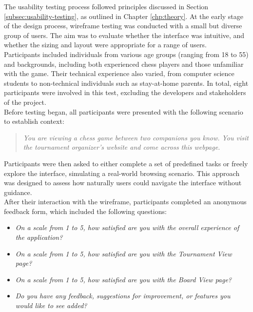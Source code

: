 The usability testing process followed principles discussed in Section \ref{subsec:usability-testing}, as outlined in Chapter \ref{chp:theory}. At the early stage of the design process, wireframe testing was conducted with a small but diverse group of users. The aim was to evaluate whether the interface was intuitive, and whether the sizing and layout were appropriate for a range of users. \\

Participants included individuals from various age groups (ranging from 18 to 55) and backgrounds, including both experienced chess players and those unfamiliar with the game. Their technical experience also varied, from computer science students to non-technical individuals such as stay-at-home parents. In total, eight participants were involved in this test, excluding the developers and stakeholders of the project. \\

Before testing began, all participants were presented with the following scenario to establish context:

\begin{quote}
\textit{You are viewing a chess game between two companions you know. You visit the tournament organizer's website and come across this webpage.}
\end{quote}

Participants were then asked to either complete a set of predefined tasks or freely explore the interface, simulating a real-world browsing scenario. This approach was designed to assess how naturally users could navigate the interface without guidance. \\

After their interaction with the wireframe, participants completed an anonymous feedback form, which included the following questions:

\begin{itemize}
    \item \textit{On a scale from 1 to 5, how satisfied are you with the overall experience of the application?}
    \item \textit{On a scale from 1 to 5, how satisfied are you with the Tournament View page?}
    \item \textit{On a scale from 1 to 5, how satisfied are you with the Board View page?}
    \item \textit{Do you have any feedback, suggestions for improvement, or features you would like to see added?}
\end{itemize}

